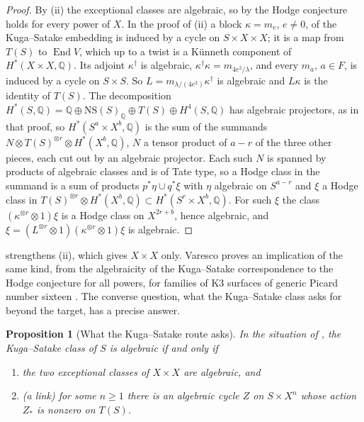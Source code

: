 \documentclass[11pt,reqno]{amsart}
\theoremstyle{plain}
\newtheorem{proposition}[theorem]{Proposition}
\theoremstyle{definition}
\theoremstyle{remark}
\newcommand{\QQ}{\mathbb{Q}}
\newcommand{\NS}{\mathrm{NS}}
\DeclareMathOperator{\End}{End}
\begin{document}
\begin{proof}
By (ii) the exceptional classes are algebraic, so by
 the Hodge conjecture holds for every power of $X$.
In the proof of (ii) a block $\kappa=m_{e}$, $e\ne0$, of
the Kuga--Satake embedding is induced by a cycle on $S\times X\times X$; it
is a map from $T(S)$ to $\End V$, which up to a twist is a K\"unneth
component of $H^{*}(X\times X,\QQ)$. Its adjoint $\kappa^{\dagger}$ is
algebraic, $\kappa^{\dagger}\kappa=m_{4e^{2}/\lambda}$, and every $m_{a}$,
$a\in F$, is induced by a cycle on $S\times S$. So
$L=m_{\lambda/(4e^{2})}\kappa^{\dagger}$ is algebraic and $L\kappa$ is the
identity of $T(S)$. The decomposition
$H^{*}(S,\QQ)=\QQ\oplus\NS(S)_{\QQ}\oplus T(S)\oplus H^{4}(S,\QQ)$ has
algebraic projectors, as in that proof, so $H^{*}(S^{a}\times X^{b},\QQ)$ is
the sum of the summands $N\otimes T(S)^{\otimes r}\otimes H^{*}(X^{b},\QQ)$,
$N$ a tensor product of $a-r$ of the three other pieces, each cut out by an
algebraic projector. Each such $N$ is spanned by products of algebraic classes
and is of Tate type, so a Hodge class in the summand is a sum of products
$p^{*}\eta\cup q^{*}\xi$ with $\eta$ algebraic on $S^{a-r}$ and $\xi$ a Hodge
class in $T(S)^{\otimes r}\otimes H^{*}(X^{b},\QQ)\subset H^{*}(S^{r}\times
X^{b},\QQ)$. For such $\xi$ the class $(\kappa^{\otimes r}\otimes1)\xi$ is a
Hodge class on $X^{2r+b}$, hence algebraic, and
$\xi=(L^{\otimes r}\otimes1)(\kappa^{\otimes r}\otimes1)\xi$ is algebraic.
\end{proof}

 strengthens (ii), which gives
$X\times X$ only. Varesco proves an implication of the same kind, from the
algebraicity of the Kuga--Satake correspondence to the Hodge conjecture for
all powers, for families of K3 surfaces of generic Picard number sixteen
\cite{Var22}. The converse question, what the Kuga--Satake class asks for
beyond the target, has a precise answer.

\begin{proposition}[What the Kuga--Satake route asks]\label{prop:mumfordkslink}
In the situation of , the Kuga--Satake class of
$S$ is algebraic if and only if
\begin{enumerate}[label=\textup{(\roman*)},nosep,leftmargin=2.6em]
\item the two exceptional classes of $X\times X$ are algebraic, and
\item \textup{(}a link\textup{)} for some $n\ge1$ there is an algebraic cycle
  $Z$ on $S\times X^{n}$ whose action $Z_{*}$ is nonzero on $T(S)$.
\end{enumerate}
\end{proposition}
\end{document}
